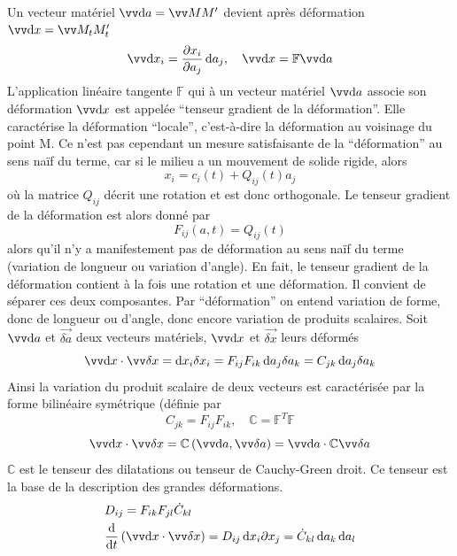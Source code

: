 Un vecteur matériel $\vec{\ud a} = \vec{MM'}$ devient après déformation $\vec{\ud x} = \vec{M_t M_t'}$
\begin{equation}
    \vec{\ud x_i} = \frac{\partial x_i}{\partial a_j} \ud a_j, \quad \vec{\ud x} = \mathbb{F} \vec{\ud a}
    \label{eq:Ch03-002}
\end{equation}
L'application linéaire tangente $\mathbb{F}$ qui à un vecteur matériel $\vec{\ud a}$ associe son déformation $\vec{\ud x}$ est appelée ``tenseur gradient de la déformation''.
Elle  caractérise la déformation ``locale'',  c'est-à-dire la déformation au  voisinage du point M.
Ce n'est pas cependant un mesure satisfaisante de la ``déformation'' au sens naïf du terme, car si le milieu a un mouvement de solide rigide, alors
\begin{equation}
    x_i = c_i (t) + Q_{ij} (t) a_j
    \label{eq:Ch03-003}
\end{equation}
où la matrice $Q_{ij}$ décrit une rotation et est donc orthogonale.
Le tenseur gradient de la déformation est alors donné par
\begin{equation}
    F_{ij} (a,t) = Q_{ij} (t)
    \label{eq:Ch03-004}
\end{equation}
alors qu'il n'y a manifestement pas de déformation au sens naïf du terme (variation de longueur ou variation d'angle).
En fait, le tenseur gradient de la déformation contient à la fois une rotation et une déformation.
Il convient de séparer ces deux composantes.
Par ``déformation'' on entend variation de forme, donc de longueur ou d'angle, donc encore variation de produits scalaires.
Soit $\vec{\ud a}$ et $\vec{\delta a}$ deux vecteurs matériels, $\vec{\ud x}$ et $\vec{\delta x}$ leurs déformés
\begin{equation}
    \vec{\ud x} \cdot \vec{\delta x} = \ud x_i \delta x_i = F_{ij} F_{ik} \ud a_j \delta a_k = C_{jk} \ud a_j \delta a_k
    \label{eq:Ch03-005}
\end{equation}
Ainsi la variation du produit scalaire de deux vecteurs est caractérisée par la forme bilinéaire symétrique (définie par
\begin{equation}
    C_{jk} = F_{ij} F_{ik}, \quad \mathbb{C} = \mathbb{F}^T \mathbb{F}
    \label{eq:Ch03-006}
\end{equation}
\begin{equation}
    \vec{\ud x} \cdot \vec{\delta x} = \mathbb{C} \left( \vec{\ud a}, \vec{\delta a} \right) = \vec{\ud a} \cdot \mathbb{C} \vec{\delta a}
    \label{eq:Ch03-007}
\end{equation}
$\mathbb{C}$ est le tenseur des dilatations ou tenseur de Cauchy-Green droit.
Ce tenseur est la base de la description des grandes déformations.
\begin{equation}
    \begin{aligned}
        & D_{ij} = F_{ik} F_{jl} \dot{C}_{kl} \\
        & \frac{\ud}{\ud t} \left( \vec{\ud x} \cdot \vec{\delta x} \right) = D_{ij} \ud x_i \partial x_j = \dot{C}_{kl} \ud a_k \ud a_l
    \end{aligned}
    \label{eq:Ch03-008}
\end{equation}
